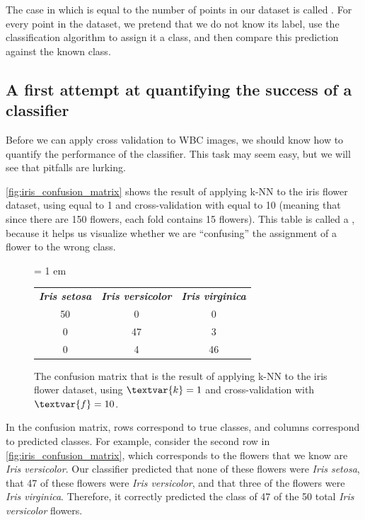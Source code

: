The case in which  is equal to the number of points in our dataset is called . For every point in the dataset, we pretend that we do not know its label, use the classification algorithm to assign it a class, and then compare this prediction against the known class.

\FloatBarrier
{}
\subsection{A first attempt at quantifying the success of a classifier}

Before we can apply cross validation to WBC images, we should know how to quantify the performance of the classifier. This task may seem easy, but we will see that pitfalls are lurking.

\autoref{fig:iris_confusion_matrix} shows the result of applying k-NN to the iris flower dataset, using  equal to 1 and cross-validation with  equal to 10 (meaning that since there are 150 flowers, each fold contains 15 flowers). This table is called a , because it helps us visualize whether we are ``confusing'' the assignment of a flower to the wrong class.\\

\begin{figure}[h]
\centering
\tabcolsep = 1 em
\mySfFamily
\begin{tabular}{c c c}
\textbf{\textit{Iris setosa}} & \textbf{\textit{Iris versicolor}} & \textbf{\textit{Iris virginica}} \\
50 & 0 & 0 \\
0 & 47 & 3 \\
0 & 4 & 46
\end{tabular}
\caption{The confusion matrix that is the result of applying k-NN to the iris flower dataset, using $\textvar{k} = \text{1}$ and cross-validation with $\textvar{f} = \text{10}$.}
\label{fig:iris_confusion_matrix}
\end{figure}

In the confusion matrix, rows correspond to true classes, and columns correspond to predicted classes. For example, consider the second row in \autoref{fig:iris_confusion_matrix}, which corresponds to the flowers that we know are \textit{Iris versicolor}. Our classifier predicted that none of these flowers were \textit{Iris setosa}, that 47 of these flowers were \textit{Iris versicolor}, and that three of the flowers were \textit{Iris virginica}. Therefore, it correctly predicted the class of 47 of the 50 total \textit{Iris versicolor} flowers.\\


